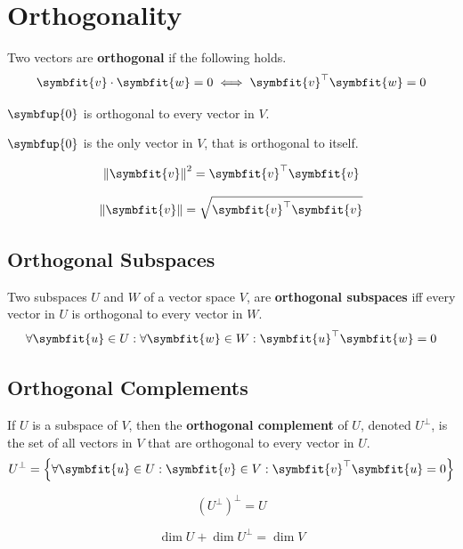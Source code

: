 \documentclass{article}
\begin{document}
\section{Orthogonality}
	\begin{definition}
		Two vectors are \textbf{orthogonal} if the following holds.
		\begin{equation*}
			\symbfit{v}\cdot \symbfit{w}=0 \iff \symbfit{v}^{\top}\symbfit{w}=0
		\end{equation*}
	\end{definition}
	\begin{theorem}
		$\symbfup{0}$ is orthogonal to every vector in $V$.
	\end{theorem}
	\begin{theorem}
		$\symbfup{0}$ is the only vector in $V$, that is orthogonal to itself.
	\end{theorem}
	\begin{theorem}
		\begin{equation*}
			\norm{\symbfit{v}}^2=\symbfit{v}^{\top}\symbfit{v}
		\end{equation*}
	\end{theorem}
	\begin{theorem}
		\begin{equation*}
			\norm{\symbfit{v}}=\sqrt{\symbfit{v}^{\top}\symbfit{v}}
		\end{equation*}
	\end{theorem}
	\subsection{Orthogonal Subspaces}
	\begin{definition}
		Two subspaces $U$ and $W$ of a vector space $V$, are \textbf{orthogonal subspaces} iff every vector in $U$ is orthogonal to every vector in $W$.
		\begin{equation*}
			\forall \symbfit{u}\in U:\forall \symbfit{w}\in W:\symbfit{u}^{\top}\symbfit{w}=0
		\end{equation*}
	\end{definition}
	\subsection{Orthogonal Complements}
	\begin{definition}
		If $U$ is a subspace of $V$, then the \textbf{orthogonal complement} of $U$, denoted $U^{\perp}$, is the set of all vectors in $V$ that are orthogonal to every vector in $U$.
		\begin{equation*}
			U^{\perp} = \left\{ \forall \symbfit{u}\in U:\symbfit{v}\in V: \symbfit{v}^{\top}\symbfit{u}=0 \right\}
		\end{equation*}
	\end{definition}
	\begin{theorem}
		\begin{equation*}
			\left( U^{\perp} \right)^{\perp}=U
		\end{equation*}
	\end{theorem}
	\begin{theorem}
		\begin{equation*}
			\dim{U} + \dim{U^{\perp}} = \dim{V}
		\end{equation*}
	\end{theorem}
\end{document}
